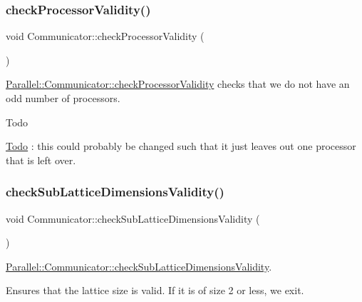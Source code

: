 \subsubsection{\texorpdfstring{checkProcessorValidity()}{checkProcessorValidity()}}
{\footnotesize\ttfamily void Communicator\+::check\+Processor\+Validity (\begin{DoxyParamCaption}{ }\end{DoxyParamCaption})\hspace{0.3cm}{\ttfamily [static]}}



\mbox{\hyperlink{class_parallel_1_1_communicator_acd7e2f114728e5207093743a58ab3a40}{Parallel\+::\+Communicator\+::check\+Processor\+Validity}} checks that we do not have an odd number of processors. 

\begin{DoxyRefDesc}{Todo}
\item[\mbox{\hyperlink{todo__todo000007}{Todo}}]\+: this could probably be changed such that it just leaves out one processor that is left over. \end{DoxyRefDesc}
\mbox{\label{class_parallel_1_1_communicator_a535fddf3fe091b82f8ca3de7974f7412}} 
\subsubsection{\texorpdfstring{checkSubLatticeDimensionsValidity()}{checkSubLatticeDimensionsValidity()}}
{\footnotesize\ttfamily void Communicator\+::check\+Sub\+Lattice\+Dimensions\+Validity (\begin{DoxyParamCaption}{ }\end{DoxyParamCaption})\hspace{0.3cm}{\ttfamily [static]}}



\mbox{\hyperlink{class_parallel_1_1_communicator_a535fddf3fe091b82f8ca3de7974f7412}{Parallel\+::\+Communicator\+::check\+Sub\+Lattice\+Dimensions\+Validity}}. 

Ensures that the lattice size is valid. If it is of size 2 or less, we exit. \mbox{\label{class_parallel_1_1_communicator_a5da7239eefebcebbeeabee499b2d724d}} 
